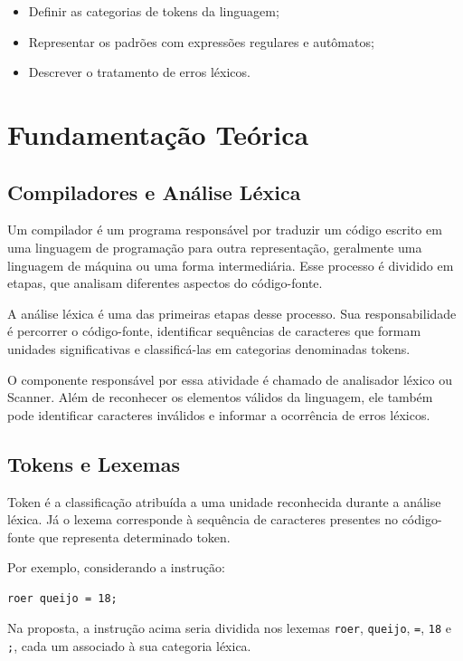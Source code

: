 \documentclass[12pt,a4paper]{article}
\begin{document}
\begin{itemize}
    \item Definir as categorias de tokens da linguagem;
    \item Representar os padrões com expressões regulares e autômatos;
    \item Descrever o tratamento de erros léxicos.
\end{itemize}


\section{Fundamentação Teórica}

\subsection{Compiladores e Análise Léxica}

Um compilador é um programa responsável por traduzir um código escrito em uma linguagem de programação para outra representação, geralmente uma linguagem de máquina ou uma forma intermediária. Esse processo é dividido em etapas, que analisam diferentes aspectos do código-fonte.

A análise léxica é uma das primeiras etapas desse processo. Sua responsabilidade é percorrer o código-fonte, identificar sequências de caracteres que formam unidades significativas e classificá-las em categorias denominadas tokens.

O componente responsável por essa atividade é chamado de analisador léxico ou Scanner. Além de reconhecer os elementos válidos da linguagem, ele também pode identificar caracteres inválidos e informar a ocorrência de erros léxicos.


\subsection{Tokens e Lexemas}

Token é a classificação atribuída a uma unidade reconhecida durante a análise léxica. Já o lexema corresponde à sequência de caracteres presentes no código-fonte que representa determinado token.

Por exemplo, considerando a instrução:

\begin{lstlisting}
roer queijo = 18;
\end{lstlisting}

Na proposta, a instrução acima seria dividida nos lexemas \texttt{roer}, \texttt{queijo}, \texttt{=}, \texttt{18} e \texttt{;}, cada um associado à sua categoria léxica.
\end{document}
